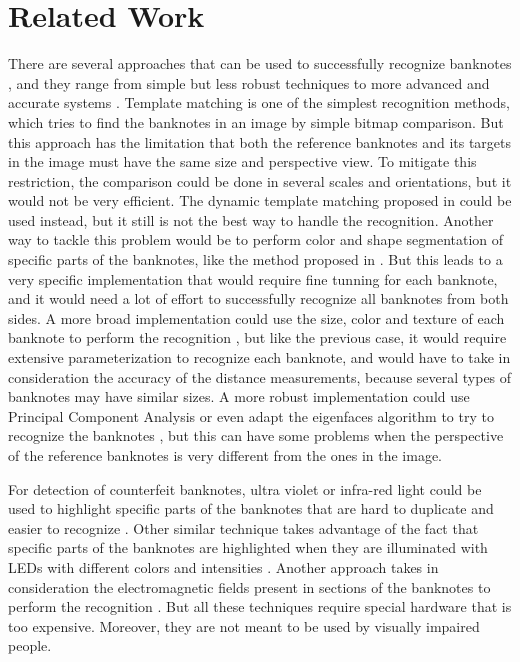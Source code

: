 \section{Related Work}\label{sec:related-work}

There are several approaches that can be used to successfully recognize banknotes \cite{Pawade2013}, and they range from simple but less robust techniques to more advanced and accurate systems \iftoggle{ebib}{\cite{Hasanuzzaman2011,Hasanuzzaman2012,Toytman2011}}{\cite{Hasanuzzaman2012}}. Template matching is one of the simplest recognition methods, which tries to find the banknotes in an image by simple bitmap comparison. But this approach has the limitation that both the reference banknotes and its targets in the image must have the same size and perspective view. To mitigate this restriction, the comparison could be done in several scales and orientations, but it would not be very efficient. The dynamic template matching proposed in \cite{Nishimura2009} could be used instead, but it still is not the best way to handle the recognition. Another way to tackle this problem would be to perform color and shape segmentation of specific parts of the banknotes, like the method proposed in \cite{Solymar2011}. But this leads to a very specific implementation that would require fine tunning for each banknote, and it would need a lot of effort to successfully recognize all banknotes from both sides. A more broad implementation could use the size, color and texture of each banknote to perform the recognition \cite{Hassanpour2007}, but like the previous case, it would require extensive parameterization to recognize each banknote, and would have to take in consideration the accuracy of the distance measurements, because several types of banknotes may have similar sizes. A more robust implementation could use Principal Component Analysis or even adapt the eigenfaces algorithm to try to recognize the banknotes \cite{Grijalva2010}, but this can have some problems when the perspective of the reference banknotes is very different from the ones in the image.

For detection of counterfeit banknotes, ultra violet or infra-red light could be used to highlight specific parts of the banknotes that are hard to duplicate and easier to recognize \cite{Kim2013}. Other similar technique takes advantage of the fact that specific parts of the banknotes are highlighted when they are illuminated with LEDs with different colors and intensities \cite{Radvanyi2011}. Another approach takes in consideration the electromagnetic fields present in sections of the banknotes to perform the recognition \cite{Qian2011}. But all these techniques require special hardware that is too expensive. Moreover, they are not meant to be used by visually impaired people.

